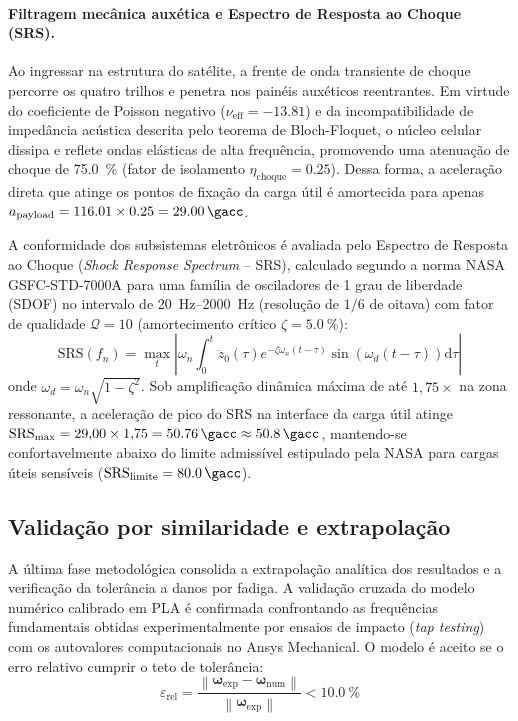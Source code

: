 \paragraph*{Filtragem mecânica auxética e Espectro de Resposta ao Choque (SRS).}
Ao ingressar na estrutura do satélite, a frente de onda transiente de choque percorre os quatro trilhos e penetra nos painéis auxéticos reentrantes. Em virtude do coeficiente de Poisson negativo ($\nu_{\text{eff}} = \num{-13.81}$) e da incompatibilidade de impedância acústica descrita pelo teorema de Bloch-Floquet, o núcleo celular dissipa e reflete ondas elásticas de alta frequência, promovendo uma atenuação de choque de \SI{75.0}{\percent} (fator de isolamento $\eta_{\text{choque}} = \num{0.25}$). Dessa forma, a aceleração direta que atinge os pontos de fixação da carga útil é amortecida para apenas $a_{\text{payload}} = \num{116.01} \times \num{0.25} = \SI{29.00}{\gacc}$.

A conformidade dos subsistemas eletrônicos é avaliada pelo Espectro de Resposta ao Choque (\textit{Shock Response Spectrum} -- SRS), calculado segundo a norma NASA GSFC-STD-7000A para uma família de osciladores de 1 grau de liberdade (SDOF) no intervalo de \SIrange{20}{2000}{\hertz} (resolução de $1/6$ de oitava) com fator de qualidade $\mathcal{Q} = 10$ (amortecimento crítico $\zeta = \SI{5.0}{\percent}$):
\begin{equation}
  \text{SRS}(f_n) = \max_{t} \left| \omega_n \int_{0}^{t} \ddot{z}_0(\tau) e^{-\zeta \omega_n (t-\tau)} \sin\!\left(\omega_d (t-\tau)\right) \mathrm{d}\tau \right|
  \label{eq:srs-calculo}
\end{equation}
onde $\omega_d = \omega_n \sqrt{1 - \zeta^2}$. Sob amplificação dinâmica máxima de até $1{,}75\times$ na zona ressonante, a aceleração de pico do SRS na interface da carga útil atinge $\text{SRS}_{\max} = 29{,}00 \times 1{,}75 = \SI{50.76}{\gacc} \approx \SI{50.8}{\gacc}$, mantendo-se confortavelmente abaixo do limite admissível estipulado pela NASA para cargas úteis sensíveis ($\text{SRS}_{\text{limite}} = \SI{80.0}{\gacc}$).

\subsection{Validação por similaridade e extrapolação}
\label{subsec:validacao}

A última fase metodológica consolida a extrapolação analítica dos resultados e a verificação da tolerância a danos por fadiga. A validação cruzada do modelo numérico calibrado em PLA é confirmada confrontando as frequências fundamentais obtidas experimentalmente por ensaios de impacto (\textit{tap testing}) com os autovalores computacionais no Ansys Mechanical. O modelo é aceito se o erro relativo cumprir o teto de tolerância:
\begin{equation}
  \varepsilon_{\text{rel}} = \frac{\left\| \boldsymbol{\omega}_{\text{exp}} - \boldsymbol{\omega}_{\text{num}} \right\|}{\left\| \boldsymbol{\omega}_{\text{exp}} \right\|} < \SI{10.0}{\percent}
  \label{eq:verr}
\end{equation}


